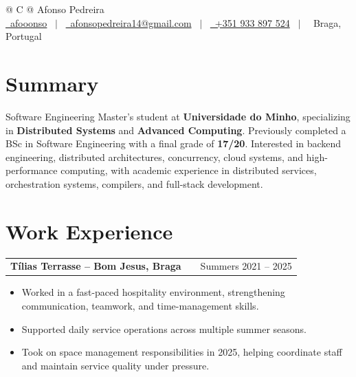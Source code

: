 \documentclass[a4paper,12pt]{article}
\makeatletter
\newenvironment{joblong}[2]
    {
    \begin{tabularx}{\linewidth}{@{}l X r@{}}
    \textbf{#1} & \hfill & #2 \\[3.75pt]
    \end{tabularx}
    \begin{minipage}[t]{\linewidth}
    \begin{itemize}[nosep,after=\strut,leftmargin=1em,itemsep=3pt,label=--]
    }
    {
    \end{itemize}
    \end{minipage}
    }
\makeatother
\begin{document}
\pagestyle{empty}


\begin{tabularx}{\linewidth}{@{} C @{}}
\Huge{Afonso Pedreira} \\[7.5pt]
\href{https://github.com/afooonso}{\raisebox{-0.05\height}\faGithub\ afooonso} \ $|$ \
\href{mailto:afonsopedreira14@gmail.com}{\raisebox{-0.05\height}\faEnvelope\ afonsopedreira14@gmail.com} \ $|$ \
\href{tel:+351933897524}{\raisebox{-0.05\height}\faMobile\ +351 933 897 524} \ $|$ \
\raisebox{-0.05\height}\faMapMarker* \ Braga, Portugal
\end{tabularx}


\section{Summary}
Software Engineering Master's student at \textbf{Universidade do Minho}, specializing in \textbf{Distributed Systems} and \textbf{Advanced Computing}. Previously completed a BSc in Software Engineering with a final grade of \textbf{17/20}. Interested in backend engineering, distributed architectures, concurrency, cloud systems, and high-performance computing, with academic experience in distributed services, orchestration systems, compilers, and full-stack development.


\section{Work Experience}

\begin{joblong}{Tílias Terrasse -- Bom Jesus, Braga}{Summers 2021 -- 2025}
\item Worked in a fast-paced hospitality environment, strengthening communication, teamwork, and time-management skills.
\item Supported daily service operations across multiple summer seasons.
\item Took on space management responsibilities in 2025, helping coordinate staff and maintain service quality under pressure.
\end{joblong}
\end{document}
